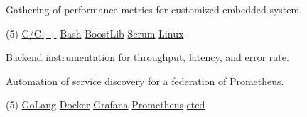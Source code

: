 \documentclass[10pt,a4paper]{altacv}
\begin{document}
{\smallskip\justifying
{\faAngleRight} {\color{description}Gathering of performance metrics for customized embedded system.}
\par}


\vspace{-0.5mm}
\begin{tasks}[label-offset=0.5mm, item-indent=5.0mm, label-align=left, label={\scriptsize\faCode}, label-format={\scriptsize\color{tech}}, item-format={\bfseries\footnotesize\color{emphasis}}](5)
	\task \href{https://www.cplusplus.com/}{C/C++}
	\task \href{https://www.gnu.org/software/bash/}{Bash}
	\task \href{https://www.boost.org/}{BoostLib}
	\task \href{http://www.scrummanifesto.org/}{Scrum}
	\task \href{https://www.archlinux.org/}{Linux}
\end{tasks}

\divider


{\smallskip\justifying
{\faAngleRight} {\color{description}Backend instrumentation for throughput, latency, and error rate.}
\par}
\smallskip

{\smallskip\justifying
{\faAngleRight} {\color{description}Automation of service discovery for a federation of Prometheus.}
\par}

\vspace{-0.5mm}
\begin{tasks}[label-offset=0.5mm, item-indent=5.0mm, label-align=left, label={\scriptsize\faCode}, label-format={\scriptsize\color{tech}}, item-format={\bfseries\footnotesize\color{emphasis}}](5)
	\task \href{https://golang.org/}{GoLang}
	\task \href{https://www.docker.com/}{Docker}
	\task \href{https://grafana.com/}{Grafana}
	\task \href{https://prometheus.io/}{Prometheus}
	\task \href{https://etcd.io/}{etcd}
\end{tasks}

\divider


\end{document}
